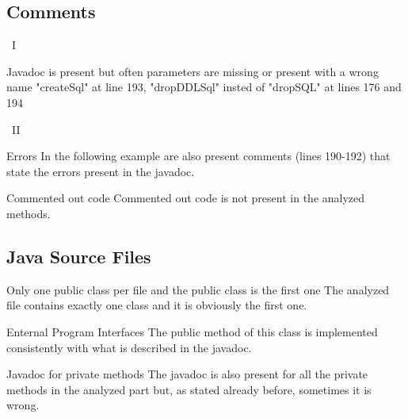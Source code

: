 \documentclass[9pt]{beamer}
\makeatletter
\newcommand*{\currentname}{\@currentlabelname}
\makeatother
\begin{document}
\subsection{Comments}

\begin{frame}{\currentname \ I}

\begin{alertblock}{Javadoc is present but often parameters are missing or present with a wrong name}
"createSql" at line 193, "dropDDLSql" insted of "dropSQL" at lines 176 and 194 
\end{alertblock}

\end{frame}

\begin{frame}{\currentname \ II}

\begin{alertblock}{Errors}
In the following example are also present comments (lines 190-192) that state the errors present in the javadoc.


\end{alertblock}

\vfill

\begin{exampleblock}{Commented out code}
Commented out code is not present in the analyzed methods.
\end{exampleblock}

\end{frame}

\subsection{Java Source Files}

\begin{frame}{\currentname}

\begin{exampleblock}{Only one public class per file and the public class is the first one}
The analyzed file contains exactly one class and it is obviously the first one.
\end{exampleblock}


\begin{exampleblock}{Enternal Program Interfaces}
The public method of this class is implemented consistently with what is described in the javadoc.
\end{exampleblock}

\begin{alertblock}{Javadoc for private methods}
The javadoc is also present for all the private methods in the analyzed part but, as stated already before, sometimes it is wrong.
\end{alertblock}
\end{frame}
\end{document}
